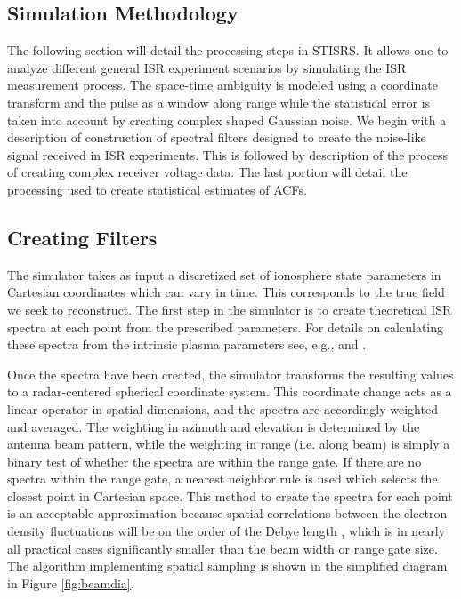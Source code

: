 \documentclass[draft,ras]{agutex}
\begin{document}
\begin{article}
\section{Simulation Methodology}

The following section will detail the processing steps in STISRS. It allows one to analyze different general ISR experiment scenarios by simulating the ISR measurement process. The space-time ambiguity is modeled using a coordinate transform and the pulse as a window along range while the statistical error is taken into account by creating complex shaped Gaussian noise.  We begin with a description of construction of spectral filters designed to create the noise-like signal received in ISR experiments. This is followed by description of the process of creating complex receiver voltage data. The last portion will detail the processing used to create statistical estimates of ACFs.

\subsection{Creating Filters}

The simulator takes as input a discretized set of ionosphere state parameters in Cartesian coordinates which can vary in time.  This corresponds to the true field we seek to reconstruct. The first step in the simulator is to create theoretical ISR spectra at each point from the prescribed parameters. For details on calculating these spectra from the intrinsic plasma parameters see, e.g., \citet{kudeki:milla:1} and \citet{kudeki:milla:2}. 

Once the spectra have been created, the simulator transforms the resulting values to a radar-centered spherical coordinate system. This coordinate change acts as a linear operator in spatial dimensions, and the spectra are accordingly weighted and averaged. The weighting in azimuth and elevation is determined by the antenna beam pattern, while the weighting in range (i.e. along beam) is simply a binary test of whether the spectra are within the range gate. If there are no spectra within the range gate, a nearest neighbor rule is used which selects the closest point in Cartesian space. This method to create the spectra for each point is an acceptable approximation because spatial correlations between the electron density fluctuations will be on the order of the Debye length \citep{farley1969}, which is in nearly all practical cases significantly smaller than the beam width or range gate size. The algorithm implementing spatial sampling is shown in the simplified diagram in Figure \ref{fig:beamdia}.


\end{article}
\end{document}
